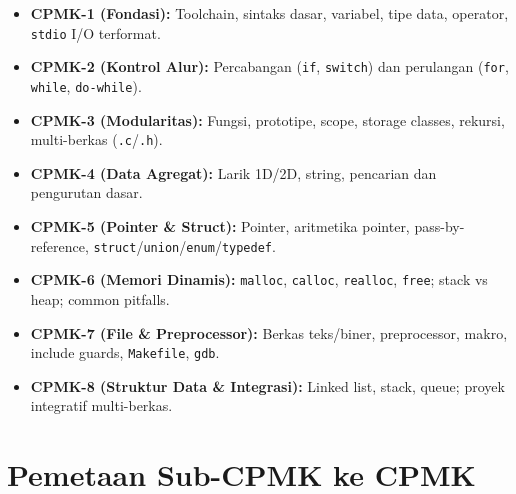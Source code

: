 \documentclass[../main.tex]{subfiles}
\begin{document}
\begin{itemize}[leftmargin=*]
  \item \textbf{CPMK-1 (Fondasi):} Toolchain, sintaks dasar, variabel, tipe data, operator, \texttt{stdio} I/O terformat.
  \item \textbf{CPMK-2 (Kontrol Alur):} Percabangan (\texttt{if}, \texttt{switch}) dan perulangan (\texttt{for}, \texttt{while}, \texttt{do-while}).
  \item \textbf{CPMK-3 (Modularitas):} Fungsi, prototipe, scope, storage classes, rekursi, multi-berkas (\texttt{.c}/\texttt{.h}).
  \item \textbf{CPMK-4 (Data Agregat):} Larik 1D/2D, string, pencarian dan pengurutan dasar.
  \item \textbf{CPMK-5 (Pointer \& Struct):} Pointer, aritmetika pointer, pass-by-reference, \texttt{struct}/\texttt{union}/\texttt{enum}/\texttt{typedef}.
  \item \textbf{CPMK-6 (Memori Dinamis):} \texttt{malloc}, \texttt{calloc}, \texttt{realloc}, \texttt{free}; stack vs heap; common pitfalls.
  \item \textbf{CPMK-7 (File \& Preprocessor):} Berkas teks/biner, preprocessor, makro, include guards, \texttt{Makefile}, \texttt{gdb}.
  \item \textbf{CPMK-8 (Struktur Data \& Integrasi):} Linked list, stack, queue; proyek integratif multi-berkas.
\end{itemize}

\section{Pemetaan Sub-CPMK ke CPMK}
\end{document}
